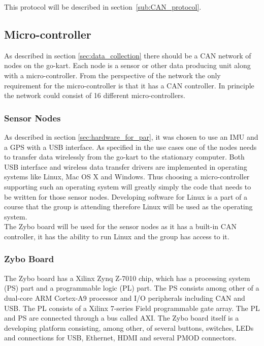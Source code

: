 This protocol will be described in section~\ref{sub:CAN_protocol}.\\








\subsection{Micro-controller}
As described in section \ref{sec:data_collection} there should be a CAN network of nodes on the go-kart.
Each node is a sensor or other data producing unit along with a micro-controller.
From the perspective of the network the only requirement for the micro-controller is that it has a CAN controller.
In principle the network could consist of 16 different micro-controllers.

\subsubsection*{Sensor Nodes}
As described in section \ref{sec:hardware_for_par}, it was chosen to use an IMU and a GPS with a USB interface. 
As specified in the use cases one of the nodes needs to transfer data wirelessly from the go-kart to the stationary computer. 
Both USB interface and wireless data transfer drivers are implemented in operating systems like Linux, Mac OS X and Windows.
Thus choosing a micro-controller supporting such an operating system will greatly simply the code that needs to be written for those sensor nodes.
Developing software for Linux is a part of a course that the group is attending therefore Linux will be used as the operating system.
\\
The Zybo board will be used for the sensor nodes as it has a built-in CAN controller, it has the ability to run Linux and the group has access to it.

\subsubsection*{Zybo Board}
The Zybo board has a Xilinx Zynq Z-7010 chip, which has a processing system (PS) part and a programmable logic (PL) part.
The PS consists among other of a dual-core ARM Cortex-A9 processor and I/O peripherals including CAN and USB.
The PL consists of a Xilinx 7-series Field programmable gate array. 
The PL and PS are connected through a bus called AXI.
The Zybo board itself is a developing platform consisting, among other, of several buttons, switches, LEDs and connections for USB, Ethernet, HDMI and several PMOD connectors.


